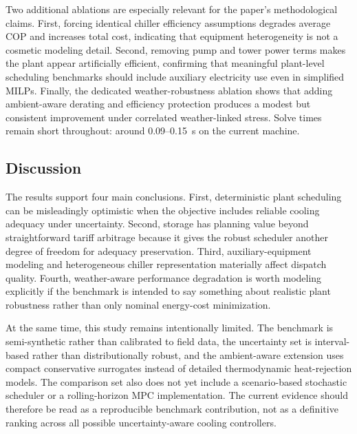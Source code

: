 Two additional ablations are especially relevant for the paper's methodological claims. First, forcing identical chiller efficiency assumptions degrades average COP and increases total cost, indicating that equipment heterogeneity is not a cosmetic modeling detail. Second, removing pump and tower power terms makes the plant appear artificially efficient, confirming that meaningful plant-level scheduling benchmarks should include auxiliary electricity use even in simplified MILPs. Finally, the dedicated weather-robustness ablation shows that adding ambient-aware derating and efficiency protection produces a modest but consistent improvement under correlated weather-linked stress. Solve times remain short throughout: around 0.09--0.15~s on the current machine.

\subsection{Discussion}

The results support four main conclusions. First, deterministic plant scheduling can be misleadingly optimistic when the objective includes reliable cooling adequacy under uncertainty. Second, storage has planning value beyond straightforward tariff arbitrage because it gives the robust scheduler another degree of freedom for adequacy preservation. Third, auxiliary-equipment modeling and heterogeneous chiller representation materially affect dispatch quality. Fourth, weather-aware performance degradation is worth modeling explicitly if the benchmark is intended to say something about realistic plant robustness rather than only nominal energy-cost minimization.

At the same time, this study remains intentionally limited. The benchmark is semi-synthetic rather than calibrated to field data, the uncertainty set is interval-based rather than distributionally robust, and the ambient-aware extension uses compact conservative surrogates instead of detailed thermodynamic heat-rejection models. The comparison set also does not yet include a scenario-based stochastic scheduler or a rolling-horizon MPC implementation. The current evidence should therefore be read as a reproducible benchmark contribution, not as a definitive ranking across all possible uncertainty-aware cooling controllers.
